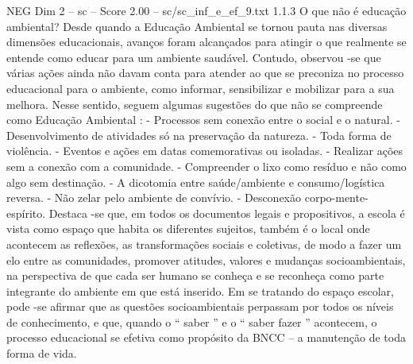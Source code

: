 \begin{textsample}{NEG Dim 2 – sc – Score 2.00 – sc/sc\_inf\_e\_ef\_9.txt}  \label{ex:f2_neg_280}
1.1.3 O que não é educação ambiental?
Desde quando a Educação Ambiental se tornou pauta nas diversas dimensões educacionais, avanços foram alcançados para atingir o que realmente se entende como educar para um ambiente saudável.
Contudo, observou -se que várias ações ainda não davam conta para atender ao que se preconiza no processo educacional para o ambiente, como informar, sensibilizar e mobilizar para a sua melhora.
Nesse sentido, seguem algumas sugestões do que não se compreende como Educação Ambiental : - Processos sem conexão entre o social e o natural. - Desenvolvimento de atividades só na preservação da natureza. - Toda forma de violência. - Eventos e ações em datas comemorativas ou isoladas. - Realizar ações sem a conexão com a comunidade. - Compreender o lixo como resíduo e não como algo sem destinação. - A dicotomia entre saúde/ambiente e consumo/logística reversa. - Não zelar pelo ambiente de convívio. - Desconexão corpo-mente-espírito.
Destaca -se que, em todos os documentos legais e propositivos, a escola é vista como espaço que habita os diferentes sujeitos, também é o local onde acontecem as reflexões, as transformações sociais e coletivas, de modo a fazer um elo entre as comunidades, promover atitudes, valores e mudanças socioambientais, na perspectiva de que cada ser humano se conheça e se reconheça como parte integrante do ambiente em que está inserido.
Em se tratando do espaço escolar, pode -se afirmar que as questões socioambientais perpassam por todos os níveis de conhecimento, e que, quando o “ saber ” e o “ saber fazer ” acontecem, o processo educacional se efetiva como propósito da BNCC – a manutenção de toda forma de vida.

\end{textsample}
